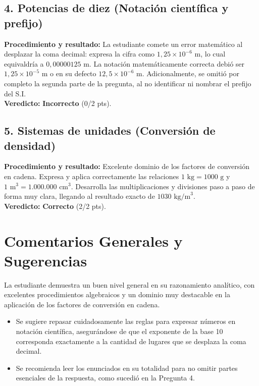 \documentclass[12pt]{article}
\begin{document}
\subsection*{4. Potencias de diez (Notación científica y prefijo)}
\textbf{Procedimiento y resultado:} La estudiante comete un error matemático al desplazar la coma decimal: expresa la cifra como $1,25 \times 10^{-6}$ m, lo cual equivaldría a $0,00000125$ m. La notación matemáticamente correcta debió ser $1,25 \times 10^{-5}$ m o en su defecto $12,5 \times 10^{-6}$ m. Adicionalmente, se omitió por completo la segunda parte de la pregunta, al no identificar ni nombrar el prefijo del S.I. \\
\textbf{Veredicto:} \textbf{Incorrecto} (0/2 pts).

\subsection*{5. Sistemas de unidades (Conversión de densidad)}
\textbf{Procedimiento y resultado:} Excelente dominio de los factores de conversión en cadena. Expresa y aplica correctamente las relaciones $1 \text{ kg} = 1000 \text{ g}$ y $1 \text{ m}^3 = 1.000.000 \text{ cm}^3$. Desarrolla las multiplicaciones y divisiones paso a paso de forma muy clara, llegando al resultado exacto de $1030 \text{ kg/m}^3$. \\
\textbf{Veredicto:} \textbf{Correcto} (2/2 pts).

\vspace{0.5cm}
\section*{Comentarios Generales y Sugerencias}
La estudiante demuestra un buen nivel general en su razonamiento analítico, con excelentes procedimientos algebraicos y un dominio muy destacable en la aplicación de los factores de conversión en cadena.
\begin{itemize}
    \item Se sugiere repasar cuidadosamente las reglas para expresar números en notación científica, asegurándose de que el exponente de la base 10 corresponda exactamente a la cantidad de lugares que se desplaza la coma decimal.
    \item Se recomienda leer los enunciados en su totalidad para no omitir partes esenciales de la respuesta, como sucedió en la Pregunta 4.
\end{itemize}
\end{document}
